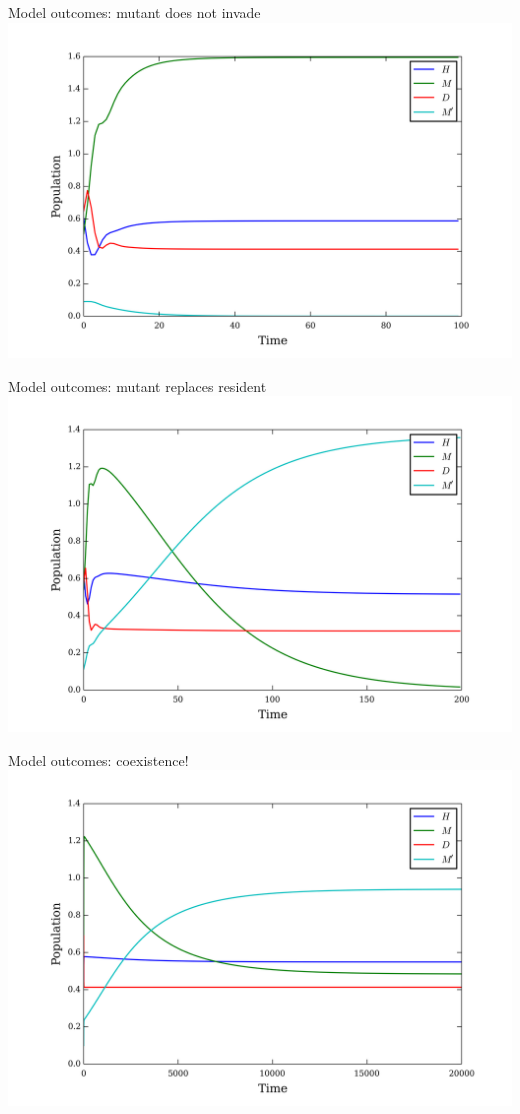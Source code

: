 \documentclass{beamer}
\begin{document}
\begin{frame}{Model outcomes: mutant does not invade}
    \includegraphics[width=1\textwidth]{dieout.png}
\end{frame}

\begin{frame}{Model outcomes: mutant replaces resident}
    \includegraphics[width=1\textwidth]{replace.png}
\end{frame}

\begin{frame}{Model outcomes: coexistence!}
    \includegraphics[width=1\textwidth]{coexist.png}
\end{frame}
\end{document}
